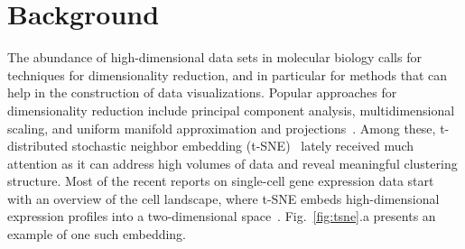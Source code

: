 \documentclass[twocolumn]{bmcart}
\begin{document}


\section*{Background}

%
%



The abundance of high-dimensional data sets in molecular biology calls for
techniques for dimensionality reduction, and in particular for methods that can
help in the construction of data visualizations. Popular approaches for
dimensionality reduction include principal component analysis, multidimensional
scaling, and uniform manifold approximation and projections~\cite{2018arXivUMAP}. Among
these, t-distributed stochastic neighbor embedding
(t-SNE)~\cite{maaten2008visualizing} lately received much attention as it can
address high volumes of data and reveal meaningful clustering structure. Most
of the recent reports on single-cell gene expression data start with an
overview of the cell landscape, where t-SNE embeds high-dimensional expression
profiles into a two-dimensional space~\cite{macosko2015highly,cao2019single,tasic2018shared}.
Fig.~\ref{fig:tsne}.a presents an example of one such embedding.
\end{document}
